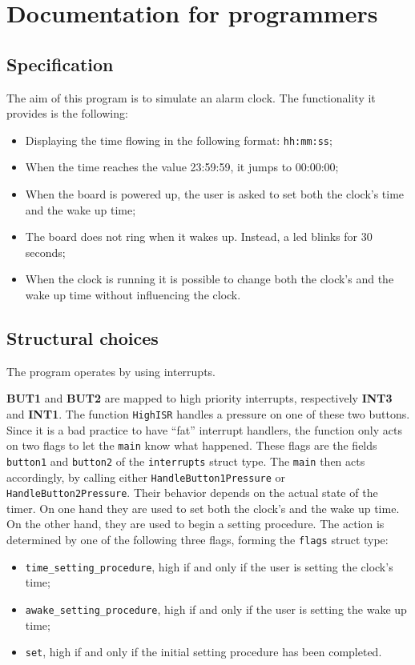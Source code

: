 \section{Documentation for programmers}
\subsection{Specification}
The aim of this program is to simulate an alarm clock. The functionality it provides is the following:
\begin{itemize}
	\item Displaying the time flowing in the following format: \texttt{hh:mm:ss};
	\item When the time reaches the value 23:59:59, it jumps to 00:00:00;
	\item When the board is powered up, the user is asked to set both the clock's time and the wake up time;
	\item The board does not ring when it wakes up. Instead, a led blinks for 30 seconds;
	\item When the clock is running it is possible to change both the clock's and the wake up time without influencing the clock.
\end{itemize}

\subsection{Structural choices}
The program operates by using interrupts.

\textbf{BUT1} and \textbf{BUT2} are mapped to high priority interrupts, respectively \textbf{INT3} and \textbf{INT1}. The function \texttt{HighISR} handles a pressure on one of these two buttons. Since it is a bad practice to have ``fat'' interrupt handlers, the function only acts on two flags to let the \texttt{main} know what happened. These flags are the fields \texttt{button1} and \texttt{button2} of the \texttt{interrupts} struct type. The \texttt{main} then acts accordingly, by calling either \texttt{HandleButton1Pressure} or \\\texttt{HandleButton2Pressure}. Their behavior depends on the actual state of the timer. On one hand they are used to set both the clock's and the wake up time. On the other hand, they are used to begin a setting procedure. The action is determined by one of the following three flags, forming the \texttt{flags} struct type:
\begin{itemize}
	\item \texttt{time\_setting\_procedure}, high if and only if the user is setting the clock's time;
	\item \texttt{awake\_setting\_procedure}, high if and only if the user is setting the wake up time;
	\item \texttt{set}, high if and only if the initial setting procedure has been completed.
\end{itemize}

